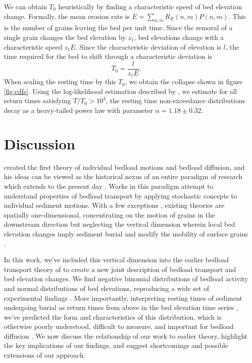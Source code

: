 \documentclass[draft]{agujournal2018}
\newcommand\be{\begin{equation}} %
\newcommand\ee{\end{equation}}   %
\begin{document}
We can obtain $T_0$ heuristically by finding a characteristic speed of bed elevation change.
Formally, the mean erosion rate is $E = \sum_{n,m}R_E(n,m)P(n,m)$.
This is the number of grains leaving the bed per unit time.
Since the removal of a single grain changes the bed elevation by $z_1$, bed elevations change with a characteristic speed $z_1 E$.
Since the characteristic deviation of elevation is $l$, the time required for the bed to shift through a characteristic deviation is
\be T_0 = \frac{l}{z_1 E}.\label{eq:time}\ee
When scaling the resting time by this $T_0$, we obtain the collapse shown in figure \ref{fig:cdfs}.
Using the log-likelihood estimation described by \citet{Newman2005}, we estimate for all return times satisfying $T/T_0 > 10^3$, the resting time non-exceedance distributions decay as a heavy-tailed power law with parameter $\alpha = 1.18 \pm 0.32$.

\section{Discussion}

\citet{Einstein1937} created the first theory of individual bedload motions and bedload diffusion, and his ideas can be viewed as the historical nexus of an entire paradigm of research which extends to the present day \citep[e.g.][]{Hubbell1964, Nakagawa1976,Hassan1991,Ancey2008, Wu2019}.
Works in this paradigm attempt to understand properties of bedload transport by applying stochastic concepts to individual sediment motions.
With a few exceptions \citep[e.g.][]{Yang1971,Nakagawa1980,Wu2019}, existing theories are spatially one-dimensional, concentrating on the motion of grains in the downstream direction but neglecting the vertical dimension wherein local bed elevation changes imply sediment burial \citep[e.g.][]{Voepel2013,Martin2014} and modify the mobility of surface grains \citep[e.g.][]{Yang1971,Nakagawa1980}.

In this work, we've included this vertical dimension into the earlier bedload transport theory of \citet{Ancey2008} to create a new joint description of bedload transport and bed elevation changes.
We find negative binomial distributions of bedload activity and normal distributions of bed elevations, reproducing a wide set of experimental findings \citep{Ancey2008, Heyman2016, Wong2007, Singh2009, Martin2014}.
More importantly, interpreting resting times of sediment undergoing burial as return times from above in the bed elevation time series \citep[e.g.][]{Voepel2013,Martin2014}, we've predicted the form and characteristics of this distribution, which is otherwise poorly understood, difficult to measure, and important for bedload diffusion \citep[e.g.][]{Voepel2013,Martin2014,Bradley2017}.
We now discuss the relationship of our work to earlier theory, highlight the key implications of our findings, and suggest shortcomings and possible extensions of our approach.
\end{document}
